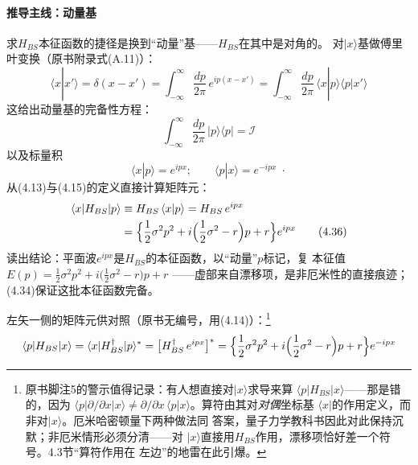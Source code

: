 \paragraph{推导主线：动量基}
求$H_{BS}$本征函数的捷径是换到“动量”基——$H_{BS}$在其中是对角的。
对$|x\rangle$基做傅里叶变换（原书附录式(A.11)）：
\begin{equation*}
\langle x|x'\rangle=\delta(x-x')
=\int_{-\infty}^{\infty}\frac{dp}{2\pi}\,e^{ip(x-x')}
=\int_{-\infty}^{\infty}\frac{dp}{2\pi}\,
\langle x|p\rangle\langle p|x'\rangle
\end{equation*}
这给出动量基的完备性方程：
\begin{equation*}
\int_{-\infty}^{\infty}\frac{dp}{2\pi}\,|p\rangle\langle p|=\mathcal{I}
\tag{4.34}
\end{equation*}
以及标量积
\begin{equation*}
\langle x|p\rangle=e^{ipx};\qquad
\langle p|x\rangle=e^{-ipx}\;\cdot
\tag{4.35}
\end{equation*}
从(4.13)与(4.15)的定义直接计算矩阵元：
\begin{align*}
\langle x|H_{BS}|p\rangle
&\equiv H_{BS}\,\langle x|p\rangle=H_{BS}\,e^{ipx}\\
&=\Bigl\{\frac{1}{2}\sigma^{2}p^{2}
+i\Bigl(\frac{1}{2}\sigma^{2}-r\Bigr)p+r\Bigr\}e^{ipx}
\tag{4.36}
\end{align*}
读出结论：平面波$e^{ipx}$是$H_{BS}$的本征函数，以“动量”$p$标记，复
本征值$E(p)=\frac{1}{2}\sigma^{2}p^{2}+i\bigl(\frac{1}{2}\sigma^{2}-r\bigr)p+r$
——虚部来自漂移项，是非厄米性的直接痕迹；(4.34)保证这批本征函数完备。

左矢一侧的矩阵元供对照（原书无编号，用(4.14)）：\footnote{原书脚注5的警示值得记录：有人想直接对$|x\rangle$求导来算
$\langle p|H_{BS}|x\rangle$——那是错的，因为
$\langle p|\partial/\partial x|x\rangle\neq
\partial/\partial x\,\langle p|x\rangle$。算符由其对\emph{对偶}坐标基
$\langle x|$的作用定义，而非对$|x\rangle$。厄米哈密顿量下两种做法同
答案，量子力学教科书因此对此保持沉默；非厄米情形必须分清——对
$|x\rangle$直接用$H_{BS}$作用，漂移项恰好差一个符号。4.3节“算符作用在
左边”的地雷在此引爆。}
\begin{equation*}
\langle p|H_{BS}|x\rangle
=\langle x|H_{BS}^{\dagger}|p\rangle^{*}
=\bigl[H_{BS}^{\dagger}\,e^{ipx}\bigr]^{*}
=\Bigl\{\frac{1}{2}\sigma^{2}p^{2}
+i\Bigl(\frac{1}{2}\sigma^{2}-r\Bigr)p+r\Bigr\}e^{-ipx}
\end{equation*}
